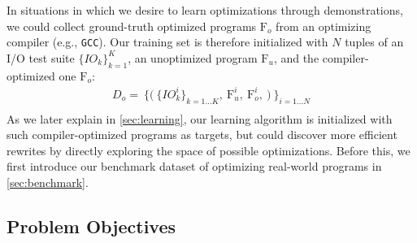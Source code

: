 \documentclass{article}
\newcommand\p{\ensuremath{{\mathrm{F}_u}}}
\newcommand\popt{\ensuremath{{\mathrm{F}_o}}}
\begin{document}
In situations in which we desire to learn optimizations through demonstrations, we could collect ground-truth optimized programs $\popt$ from an optimizing compiler (e.g., \texttt{GCC}).
Our training set is therefore initialized with $N$ tuples of an I/O test suite $\{IO_k\}_{k=1}^K$, an unoptimized program $\p$, and the compiler-optimized one $\popt$:
\begin{equation} 
    \begin{split}
    \label{eqn:init_dataset}
        D_o = \
                \bigg\{
                    \Big( \
                        \{IO_k^i\}_{k=1...K}, \
                        \textrm{F}_{u}^i, \
                        \textrm{F}_{o}^i, \
                    \Big) \
                \bigg\}_{i = 1...N} \\
    \end{split}
\end{equation}
As we later explain in \cref{sec:learning}, our learning algorithm is initialized with such  compiler-optimized programs as targets, but could discover more efficient rewrites by directly exploring the space of possible optimizations.
Before this, we first introduce our benchmark dataset of optimizing real-world programs in \cref{sec:benchmark}.

\subsection{Problem Objectives}
\end{document}

